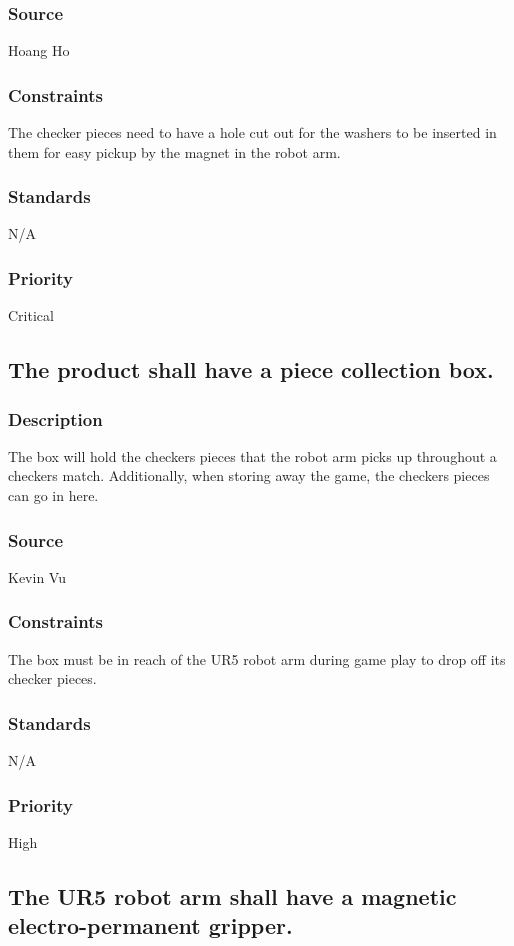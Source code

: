 \subsubsection{Source}
Hoang Ho
\subsubsection{Constraints}
The checker pieces need to have a hole cut out for the washers to be inserted in them for easy pickup by the magnet in the robot arm. 
\subsubsection{Standards}
N/A
\subsubsection{Priority}
Critical

\subsection{The product shall have a piece collection box.}
\subsubsection{Description}
The box will hold the checkers pieces that the robot arm picks up throughout a checkers match. Additionally, when storing away the game, the checkers pieces can go in here.
\subsubsection{Source}
Kevin Vu
\subsubsection{Constraints}
The box must be in reach of the UR5 robot arm during game play to drop off its checker pieces.
\subsubsection{Standards}
N/A
\subsubsection{Priority}
High

\subsection{The UR5 robot arm shall have a magnetic electro-permanent gripper.}

